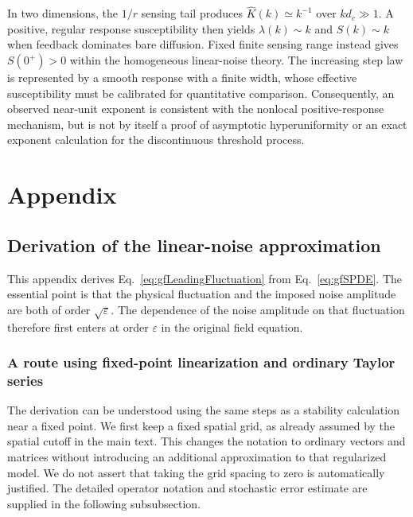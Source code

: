 \documentclass{article}
\begin{document}
\begin{keybox}
In two dimensions, the $1/r$ sensing tail produces $\widehat K(k)\simeq k^{-1}$ over $kd_c\gg1$. A positive, regular response susceptibility then yields $\lambda(k)\sim k$ and $S(k)\sim k$ when feedback dominates bare diffusion. Fixed finite sensing range instead gives $S(0^+)>0$ within the homogeneous linear-noise theory. The increasing step law is represented by a smooth response with a finite width, whose effective susceptibility must be calibrated for quantitative comparison. Consequently, an observed near-unit exponent is consistent with the nonlocal positive-response mechanism, but is not by itself a proof of asymptotic hyperuniformity or an exact exponent calculation for the discontinuous threshold process.
\end{keybox}


\section{Appendix}

\subsection{Derivation of the linear-noise approximation}
\label{appendix:linearNoiseExpansion}

This appendix derives Eq.~\eqref{eq:gfLeadingFluctuation} from Eq.~\eqref{eq:gfSPDE}. The essential point is that the physical fluctuation and the imposed noise amplitude are both of order $\sqrt{\varepsilon}$. The dependence of the noise amplitude on that fluctuation therefore first enters at order $\varepsilon$ in the original field equation.

\subsubsection{A route using fixed-point linearization and ordinary Taylor series}

The derivation can be understood using the same steps as a stability calculation near a fixed point. We first keep a fixed spatial grid, as already assumed by the spatial cutoff in the main text. This changes the notation to ordinary vectors and matrices without introducing an additional approximation to that regularized model. We do not assert that taking the grid spacing to zero is automatically justified. The detailed operator notation and stochastic error estimate are supplied in the following subsubsection.
\end{document}
